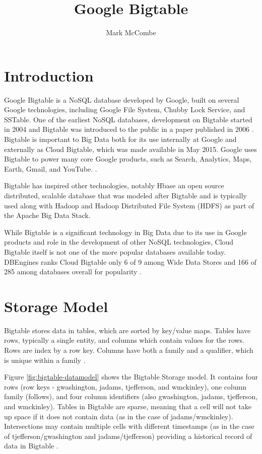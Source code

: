 \documentclass[9pt,twocolumn,twoside]{../../styles/osajnl}
\title{Google Bigtable}
\author[1,*]{Mark McCombe}
\affil[1]{School of Informatics and Computing, Bloomington, IN 47408, U.S.A.}
\affil[*]{Corresponding authors: mmccombe@iu.edu}
\begin{document}
\maketitle

\section{Introduction}

Google Bigtable is a NoSQL database developed by Google, built on several Google technologies, including Google File System, Chubby Lock Service, and SSTable\cite{www-wikibigtable}.  One of the earliest NoSQL databases, development on Bigtable started in 2004 and Bigtable was introduced to the public in a paper published in 2006 \cite{introbigtable}. Bigtable is important to Big Data both for its use internally at Google and externally as Cloud Bigtable, which was made available in May 2015. Google uses Bigtable to power many core Google products, such as Search, Analytics, Maps, Earth, Gmail, and YouTube. \cite{www-wikibigtable}.

Bigtable has inspired other technologies, notably Hbase \cite{www-hbase} an open source distributed, scalable database that was modeled after Bigtable and is typically used along with Hadoop and Hadoop Distributed File System (HDFS) as part of the Apache Big Data Stack.

While Bigtable is a significant technology in Big Data due to its use in Google products and role in the development of other NoSQL technologies, Cloud Bigtable itself is not one of the more popular databases available today.  DBEngines ranks Cloud Bigtable only 6 of 9 among Wide Data Stores and 166 of 285 among databases overall for popularity \cite{www-dbengines}.

\section{Storage Model}

Bigtable stores data in tables, which are sorted by key/value maps. Tables have rows, typically a single entity, and columns which contain values for the rows. Rows are index by a row key. Columns have both a family and a qualifier, which is unique within a family \cite{www-bigtabledocoverview}.

Figure \ref{fig:bigtable-datamodel} shows the Bigtable Storage model. It contains four rows (row keys - gwashington, jadams, tjefferson, and wmckinley), one column family (follows), and four column identifiers (also gwashington, jadams, tjefferson, and wmckinley). Tables in Bigtable are sparse, meaning that a cell will not take up space if it does not contain data (as in the case of jadams/wmckinley).  Intersections may contain multiple cells with different timestamps (as in the case of tjefferson/gwashington and jadams/tjefferson) providing a historical record of data in Bigtable \cite{www-bigtabledocoverview}.
\end{document}

